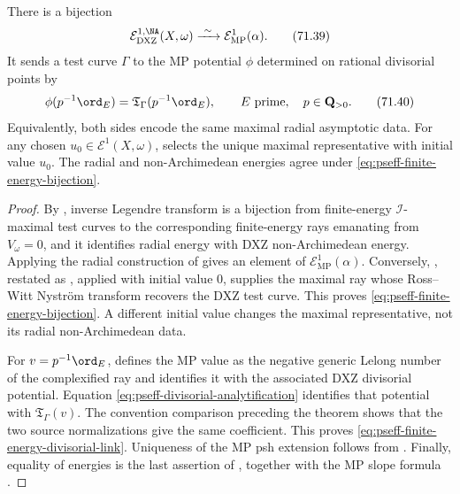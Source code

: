 \begin{theorem}\label{thm:pseff-kahler-finite-energy-link}
There is a bijection
\[
 \mathcal E^{1,\NA}_{\mathrm{DXZ}}(X,\omega)
 \xrightarrow{\ \sim\ }
 \mathcal E^1_{\mathrm{MP}}(\alpha).
\tag{71.39}\label{eq:pseff-finite-energy-bijection}
\]
It sends a test curve \(\Gamma\) to the MP potential \(\phi\) determined
on rational divisorial points by
\[
 \phi(p^{-1}\ord_E)
 =\mathfrak T_\Gamma(p^{-1}\ord_E),
 \qquad E\text{ prime},\quad p\in\mathbf Q_{>0}.
\tag{71.40}\label{eq:pseff-finite-energy-divisorial-link}
\]
Equivalently, both sides encode the same maximal radial asymptotic data.
For any chosen \(u_0\in\mathcal E^1(X,\omega)\),
 selects the unique maximal representative with
initial value \(u_0\).  The radial and non-Archimedean energies agree under
\eqref{eq:pseff-finite-energy-bijection}.
\end{theorem}

\begin{proof}
By \cite[Theorem~3.17]{DXZ23}, inverse Legendre transform is a bijection
from finite-energy \(\mathcal I\)-maximal test curves to the corresponding
finite-energy rays emanating from \(V_\omega=0\), and it identifies radial
energy with DXZ non-Archimedean energy.  Applying the radial construction
of \cite[Theorem~5.1.4 and Section~5.2]{MP24} gives an element of
\(\mathcal E^1_{\mathrm{MP}}(\alpha)\).  Conversely,
\cite[Theorem~5.1.7]{MP24}, restated as
, applied with initial value \(0\), supplies the
maximal ray whose Ross--Witt Nystr\"om transform recovers the DXZ test
curve.  This proves \eqref{eq:pseff-finite-energy-bijection}.  A different
initial value changes the maximal representative, not its radial
non-Archimedean data.

For \(v=p^{-1}\ord_E\), \cite[Theorem~5.1.4 and Section~5.2]{MP24}
defines the MP value as the negative generic Lelong number of the
complexified ray and identifies it with the associated DXZ divisorial
potential.  Equation \eqref{eq:pseff-divisorial-analytification} identifies
that potential with \(\mathfrak T_\Gamma(v)\).  The convention comparison
preceding the theorem shows that the two source normalizations give the
same coefficient.  This proves
\eqref{eq:pseff-finite-energy-divisorial-link}.  Uniqueness of the MP psh
extension follows from \cite[Theorem~4.3.8]{MP24}.  Finally, equality of
energies is the last assertion of \cite[Theorem~3.17]{DXZ23}, together
with the MP slope formula \cite[Theorem~5.3.4]{MP24}.
\end{proof}

